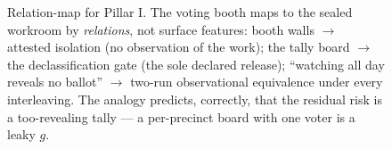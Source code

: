 \begin{figure}[htbp]
{\begin{tikzpicture}[x=1cm,y=1cm]
\end{tikzpicture}%
}
\caption{Relation-map for Pillar I. The voting booth maps to the sealed workroom by
\emph{relations}, not surface features: booth walls $\to$ attested isolation (no observation of the work); the tally board $\to$
the declassification gate (the sole declared release); ``watching all day reveals no ballot'' $\to$ two-run observational
equivalence under every interleaving. The analogy predicts, correctly, that the residual risk is a too-revealing tally --- a
per-precinct board with one voter is a leaky $g$.}
\label{fig:r9rel}
\end{figure}
